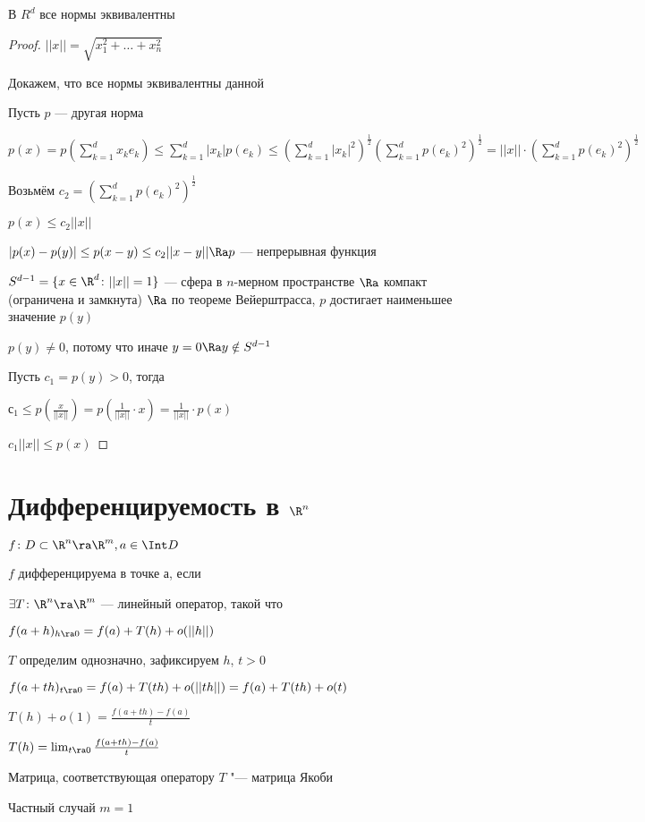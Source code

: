 \begin{theorem}
В  $R^d$ все нормы эквивалентны
\end{theorem}

\begin{proof}
$||x|| = \sqrt{x_1^2 + \dots + x_n^2}$

Докажем, что все нормы эквивалентны данной

Пусть $p$ --- другая норма

$p(x) = p(\sum_{k = 1}^d x_k e_k) \le \sum_{k = 1}^d |x_k| p(e_k) \le (\sum_{k = 1}^d |x_k|^2)^{\frac{1}{2}} (\sum_{k = 1}^d p(e_k)^2)^{\frac{1}{2}} = ||x|| \cdot (\sum_{k = 1}^d p(e_k)^2)^{\frac{1}{2}}$

Возьмём $c_2 = (\sum_{k = 1}^d p(e_k)^2)^{\frac{1}{2}}$

$p(x) \le c_2 ||x||$

$|p(x) - p(y)| \le p(x - y) \le c_2 ||x - y|| \Ra p$ --- непрерывная функция

$S^{d - 1} = \{x\in \R^d \colon ||x|| = 1\}$ --- сфера в $n$-мерном пространстве $\Ra$ компакт (ограничена и замкнута) $\Ra$ по теореме Вейерштрасса, $p$ достигает наименьшее значение $p(y)$

$p(y) \neq 0$, потому что иначе $y = 0 \Ra y \notin S^{d - 1}$

Пусть $c_1 = p(y) > 0$, тогда

$с_1 \le p(\frac{x}{||x||}) = p(\frac{1}{||x||} \cdot x) = \frac{1}{||x||} \cdot p(x)$

$c_1||x|| \le p(x)$
\end{proof}

\section{Дифференцируемость в $\R^n$}

\begin{Def}
$f \colon D \subset \R^n \ra \R^m, a \in \Int D$

$f$ дифференцируема в точке а, если

$\exists T \colon \R^n \ra \R^m$ --- линейный оператор, такой что

$f(a + h)_{h \ra 0} = f(a) + T(h) + o(||h||)$
\end{Def}
\begin{Rem}
$T$ определим однозначно, зафиксируем $h$, $t > 0$

$f(a + th)_{t \ra 0} = f(a) + T(th) + o(||th||) = f(a) + T(th) + o(t)$

$T(h) + o(1) = \frac{f(a + th) - f(a)}{t}$

$T(h) = \lim_{t \ra 0} \frac{f(a + th) - f(a)}{t}$
\end{Rem}
\begin{Def}
Матрица, соответствующая оператору $T$ "--- матрица Якоби
\end{Def}
Частный случай $m = 1$

